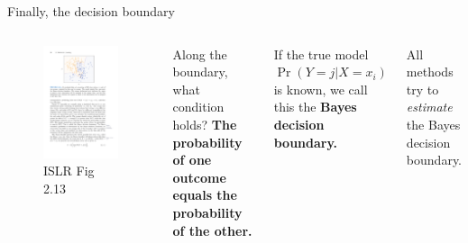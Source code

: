 \documentclass[aspectratio=169]{beamer}
\begin{document}
\begin{frame}{Finally, the decision boundary}
\begin{columns}
\begin{figure}
\includegraphics[width=\textwidth]{bayes_decision_boundary}
\caption*{ISLR Fig 2.13}
\end{figure}
Along the boundary, what condition holds?  \pause \textbf{The probability of one outcome equals the probability of the other.}

\vspace{5mm}

If the true model  $\Pr(Y=j|X = x_i)$ is known, we call this the \textbf{Bayes decision boundary.}

\vspace{5mm}

All methods try to \textit{estimate} the Bayes decision boundary.  

\end{columns}
\end{frame}
\end{document}
